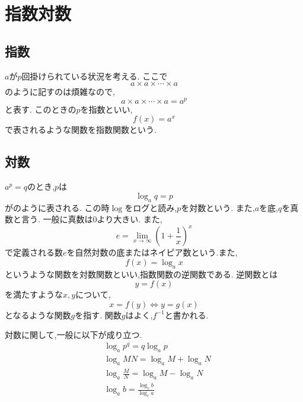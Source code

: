 
  \section{指数対数}\label{節：指数対数}
    \subsection{指数}\label{節：指数}
      $a$が$p$回掛けられている状況を考える.
      ここで
      \[
        a\times a\times\cdots\times a
      \]
      のように記すのは煩雑なので,
      \[
        a\times a\times\cdots\times a=a^p
      \]
      と表す.
      このときの$p$を指数といい,
      \[
        f(x)=a^x
      \]
      で表されるような関数を指数関数という.
    \subsection{対数}\label{節：対数}
      $a^p=q$のとき,$p$は
      \[
        \log_a{q}=p
      \]
      がのように表される.
      この時$\log$をログと読み,$p$を対数という.
      また,$a$を底,$q$を真数と言う.
      一般に真数は0より大きい.
      また,
      \[
        e=\lim_{x \to \infty} \left(1+\frac{1}{x}\right)^x
      \]
      で定義される数$e$を自然対数の底またはネイピア数という.また,
      \[
        f(x)=\log_a x
      \]
      というような関数を対数関数といい,指数関数の逆関数である.
      逆関数とは
      \[
        y=f(x)
      \]
      を満たすような$x,y$について,
      \[
        x=f(y) \iff y=g(x)
      \]
      となるような関数$g$を指す.
      関数$g$はよく,$f^{-1}$と書かれる.

      対数に関して,一般に以下が成り立つ.
      \begin{align*}
        &\log_a{p^q}=q\log_a{p}\\
        &\log_a{MN}=\log_a{M}+\log_a{N}\\
        &\log_a{\frac{M}{N}}=\log_a{M}-\log_a{N}\\
        &\log_a{b}=\frac{\log_c{b}}{\log_c{a}}
      \end{align*}
    
